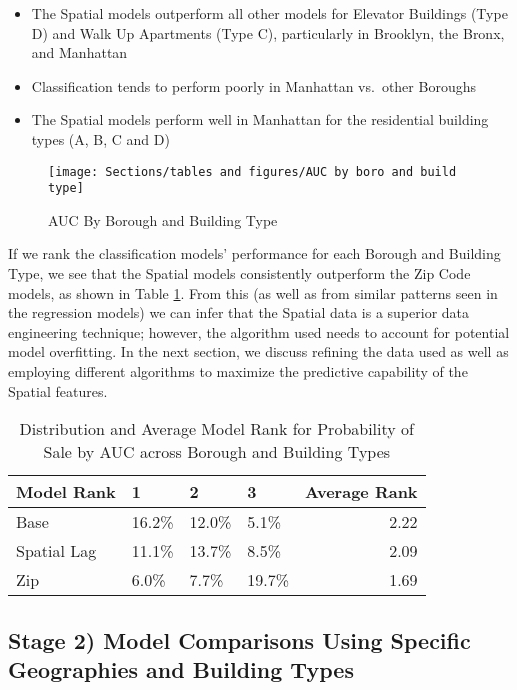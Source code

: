 \documentclass[12pt,]{article}
\providecommand{\tightlist}{%
  \setlength{\itemsep}{0pt}\setlength{\parskip}{0pt}}
\begin{document}
\begin{itemize}
\tightlist
\item
  The Spatial models outperform all other models for Elevator Buildings
  (Type D) and Walk Up Apartments (Type C), particularly in Brooklyn,
  the Bronx, and Manhattan
\item
  Classification tends to perform poorly in Manhattan vs.~other Boroughs
\item
  The Spatial models perform well in Manhattan for the residential
  building types (A, B, C and D)
\end{itemize}

\begin{figure}[H]
\texttt{[image: Sections/tables and figures/AUC by boro and build type]} \caption{AUC By Borough and Building Type}\label{fig:AUC by boro and build type}
\end{figure}

If we rank the classification models' performance for each Borough and
Building Type, we see that the Spatial models consistently outperform
the Zip Code models, as shown in Table \ref{tab:ProbModelAUCRank}. From
this (as well as from similar patterns seen in the regression models) we
can infer that the Spatial data is a superior data engineering
technique; however, the algorithm used needs to account for potential
model overfitting. In the next section, we discuss refining the data
used as well as employing different algorithms to maximize the
predictive capability of the Spatial features.

\begin{table}

\caption{\label{tab:Prob Model AUC Average Rank}\label{tab:ProbModelAUCRank} Distribution and Average Model Rank for Probability of Sale by AUC across Borough and Building Types}
\centering
\begin{tabular}[t]{llllr}
\toprule
Model Rank & 1 & 2 & 3 & Average Rank\\
\midrule
Base & 16.2\% & 12.0\% & 5.1\% & 2.22\\
Spatial Lag & 11.1\% & 13.7\% & 8.5\% & 2.09\\
Zip & 6.0\% & 7.7\% & 19.7\% & 1.69\\
\bottomrule
\end{tabular}
\end{table}

\hypertarget{stage-2-model-comparisons-using-specific-geographies-and-building-types}{%
\subsection{Stage 2) Model Comparisons Using Specific Geographies and
Building
Types}\label{stage-2-model-comparisons-using-specific-geographies-and-building-types}}
\end{document}
